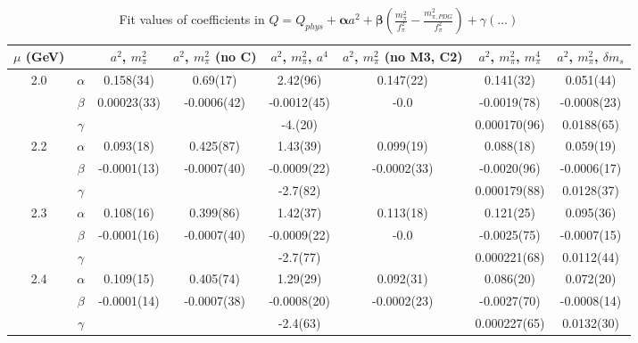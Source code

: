 \documentclass[12pt]{extarticle}
\begin{document}
\begin{table}[h!]
\begin{center}
\begin{tabular}{|c c|c|c|c|c|c|c|}
\hline
$\mu$ (GeV) &  & $a^2$, $m_\pi^2$& $a^2$, $m_\pi^2$ (no C)& $a^2$, $m_\pi^2$, $a^4$& $a^2$, $m_\pi^2$ (no M3, C2)& $a^2$, $m_\pi^2$, $m_\pi^4$& $a^2$, $m_\pi^2$, $\delta m_s$\\
\hline
\multirow{3}{0.5in}{2.0} & $\alpha$ & 0.158(34)& 0.69(17)& 2.42(96)& 0.147(22)& 0.141(32)& 0.051(44)\\
 & $\beta$ & 0.00023(33)& -0.0006(42)& -0.0012(45)& -0.0& -0.0019(78)& -0.0008(23)\\
 & $\gamma$ &  &  & -4.(20)&  & 0.000170(96)& 0.0188(65)\\
\hline
\multirow{3}{0.5in}{2.2} & $\alpha$ & 0.093(18)& 0.425(87)& 1.43(39)& 0.099(19)& 0.088(18)& 0.059(19)\\
 & $\beta$ & -0.0001(13)& -0.0007(40)& -0.0009(22)& -0.0002(33)& -0.0020(96)& -0.0006(17)\\
 & $\gamma$ &  &  & -2.7(82)&  & 0.000179(88)& 0.0128(37)\\
\hline
\multirow{3}{0.5in}{2.3} & $\alpha$ & 0.108(16)& 0.399(86)& 1.42(37)& 0.113(18)& 0.121(25)& 0.095(36)\\
 & $\beta$ & -0.0001(16)& -0.0007(40)& -0.0009(22)& -0.0& -0.0025(75)& -0.0007(15)\\
 & $\gamma$ &  &  & -2.7(77)&  & 0.000221(68)& 0.0112(44)\\
\hline
\multirow{3}{0.5in}{2.4} & $\alpha$ & 0.109(15)& 0.405(74)& 1.29(29)& 0.092(31)& 0.086(20)& 0.072(20)\\
 & $\beta$ & -0.0001(14)& -0.0007(38)& -0.0008(20)& -0.0002(23)& -0.0027(70)& -0.0008(14)\\
 & $\gamma$ &  &  & -2.4(63)&  & 0.000227(65)& 0.0132(30)\\
\hline
\end{tabular}
\caption{Fit values of coefficients in $Q = Q_{phys} + \mathbf{\alpha} a^2 + \mathbf{\beta}\left(\frac{m_\pi^2}{f_\pi^2}-\frac{m_{\pi,PDG}^2}{f_\pi^2}\right) + \gamma(\ldots)$}
\end{center}
\end{table}







\end{document}
